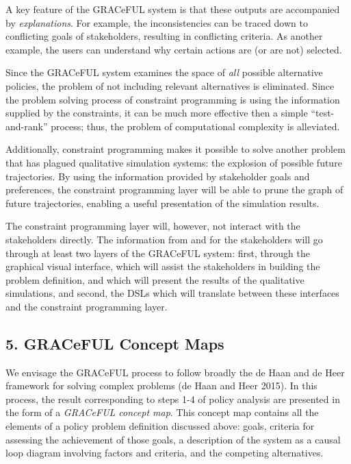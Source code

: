 \documentclass[]{article}
\begin{document}
A key feature of the GRACeFUL system is that these outputs are
accompanied by \emph{explanations}. For example, the inconsistencies can
be traced down to conflicting goals of stakeholders, resulting in
conflicting criteria. As another example, the users can understand why
certain actions are (or are not) selected.

Since the GRACeFUL system examines the space of \emph{all} possible
alternative policies, the problem of not including relevant alternatives
is eliminated. Since the problem solving process of constraint
programming is using the information supplied by the constraints, it can
be much more effective then a simple ``test-and-rank'' process; thus,
the problem of computational complexity is alleviated.

Additionally, constraint programming makes it possible to solve another
problem that has plagued qualitative simulation systems: the explosion
of possible future trajectories. By using the information provided by
stakeholder goals and preferences, the constraint programming layer will
be able to prune the graph of future trajectories, enabling a useful
presentation of the simulation results.

The constraint programming layer will, however, not interact with the
stakeholders directly. The information from and for the stakeholders
will go through at least two layers of the GRACeFUL system: first,
through the graphical visual interface, which will assist the
stakeholders in building the problem definition, and which will present
the results of the qualitative simulations, and second, the DSLs which
will translate between these interfaces and the constraint programming
layer.

\subsection{5. GRACeFUL Concept Maps}\label{graceful-concept-maps}

We envisage the GRACeFUL process to follow broadly the de Haan and de
Heer framework for solving complex problems ({de Haan} and Heer 2015).
In this process, the result corresponding to steps 1-4 of policy
analysis are presented in the form of a \emph{GRACeFUL concept map}.
This concept map contains all the elements of a policy problem
definition discussed above: goals, criteria for assessing the
achievement of those goals, a description of the system as a causal loop
diagram involving factors and criteria, and the competing alternatives.
\end{document}
